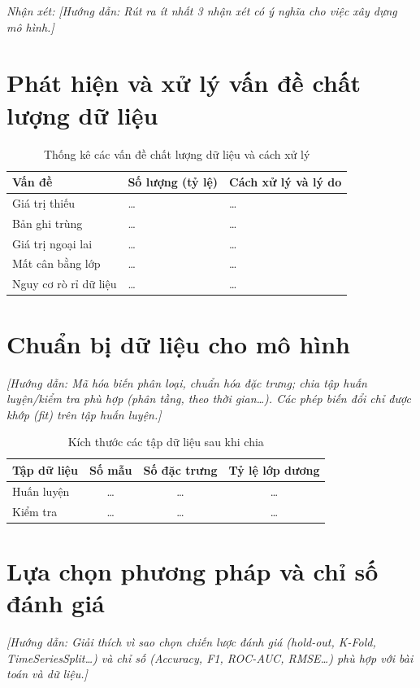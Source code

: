 \documentclass[12pt,a4paper,oneside]{report}
\newcommand{\huongdan}[1]{{\color{guide}\itshape [Hướng dẫn: #1]}}
\begin{document}
\textit{Nhận xét:} \huongdan{Rút ra ít nhất 3 nhận xét có ý nghĩa cho việc
xây dựng mô hình.}

\section{Phát hiện và xử lý vấn đề chất lượng dữ liệu}

\begin{table}[H]
  \centering
  \caption{Thống kê các vấn đề chất lượng dữ liệu và cách xử lý}
  \label{tab:chatluong}
  \begin{tabularx}{\textwidth}{p{3.2cm} >{\centering\arraybackslash}p{2.6cm} X}
    \toprule
    \textbf{Vấn đề} & \textbf{Số lượng (tỷ lệ)} & \textbf{Cách xử lý và lý do} \\
    \midrule
    Giá trị thiếu       & \dots & \dots \\
    Bản ghi trùng       & \dots & \dots \\
    Giá trị ngoại lai   & \dots & \dots \\
    Mất cân bằng lớp    & \dots & \dots \\
    Nguy cơ rò rỉ dữ liệu & \dots & \dots \\
    \bottomrule
  \end{tabularx}
\end{table}

\section{Chuẩn bị dữ liệu cho mô hình}
\huongdan{Mã hóa biến phân loại, chuẩn hóa đặc trưng; chia tập huấn
luyện/kiểm tra phù hợp (phân tầng, theo thời gian\dots). Các phép biến đổi
chỉ được khớp (fit) trên tập huấn luyện.}

\begin{table}[H]
  \centering
  \caption{Kích thước các tập dữ liệu sau khi chia}
  \label{tab:kichthuoc}
  \begin{tabular}{lccc}
    \toprule
    \textbf{Tập dữ liệu} & \textbf{Số mẫu} & \textbf{Số đặc trưng} & \textbf{Tỷ lệ lớp dương} \\
    \midrule
    Huấn luyện & \dots & \dots & \dots \\
    Kiểm tra   & \dots & \dots & \dots \\
    \bottomrule
  \end{tabular}
\end{table}

\section{Lựa chọn phương pháp và chỉ số đánh giá}
\huongdan{Giải thích vì sao chọn chiến lược đánh giá (hold-out, K-Fold,
TimeSeriesSplit\dots) và chỉ số (Accuracy, F1, ROC-AUC, RMSE\dots) phù hợp
với bài toán và dữ liệu.}
\end{document}
